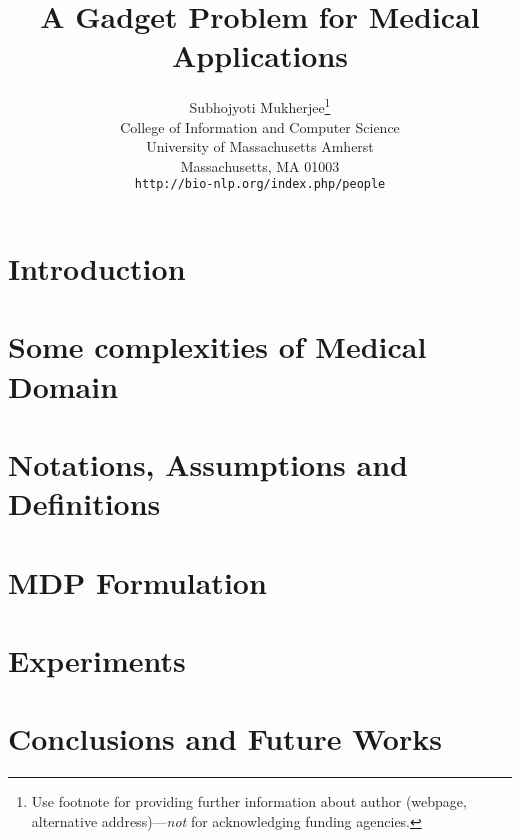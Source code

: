 \documentclass{article}
\title{A Gadget Problem for Medical Applications}
\author{
  Subhojyoti Mukherjee\thanks{Use footnote for providing further
    information about author (webpage, alternative
    address)---\emph{not} for acknowledging funding agencies.} \\
  College of Information and Computer Science\\
  University of Massachusetts Amherst\\
  Massachusetts, MA 01003 \\
  \texttt{http://bio-nlp.org/index.php/people} \\
}
\begin{document}

\maketitle



\section{Introduction}
\label{review:intro}


\section{Some complexities of Medical Domain}
\label{review:complexity}



\section{Notations, Assumptions and Definitions}
\label{review:notations}


\section{MDP Formulation}
\label{review:mdp}




\section{Experiments}
\label{review:expt}



\section{Conclusions and Future Works}
\label{review:conc}






\end{document}
